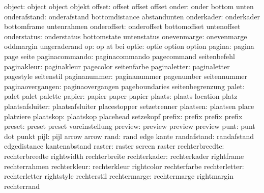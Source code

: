               object:  object               object               objekt
              offset:  offset               offset               offset
               onder:  onder                bottom               unten
        onderafstand:  onderafstand         bottomdistance       abstandunten
          onderkader:  onderkader           bottomframe          untenrahmen
         onderoffset:  onderoffset          bottomoffset         untenoffset
         onderstatus:  onderstatus          bottomstate          untenstatus
         onevenmarge:  onevenmarge          oddmargin            ungeraderand
                  op:  op                   at                   bei
               optie:  optie                option               option
              pagina:  pagina               page                 seite
      paginacommando:  paginacommando       pagecommand          seitenbefehl
         paginakleur:  paginakleur          pagecolor            seitenfarbe
        paginaletter:  paginaletter         pagestyle            seitenstil
        paginanummer:  paginanummer         pagenumber           seitennummer
    paginaovergangen:  paginaovergangen     pageboundaries       seitenbegrenzung
               palet:  palet                palet                palette
              papier:  papier               paper                papier
              plaats:  plaats               location             platz
     plaatsafsluiter:  plaatsafsluiter      placestopper         setzetrenner
            plaatsen:  plaatsen             place                platziere
           plaatskop:  plaatskop            placehead            setzekopf
              prefix:  prefix               prefix               prefix
              preset:  preset               preset               voreinstellung
             preview:  preview              preview              preview
                punt:  punt                 dot                  punkt
                pijl:  pijl                 arrow                arrow %
                rand:  rand                 edge                 kante
         randafstand:  randafstand          edgedistance         kantenabstand
              raster:  raster               screen               raster
      rechterbreedte:  rechterbreedte       rightwidth           rechterbreite
        rechterkader:  rechterkader         rightframe           rechterrahmen
        rechterkleur:  rechterkleur         rightcolor           rechterfarbe
       rechterletter:  rechterletter        rightstyle           rechterstil
        rechtermarge:  rechtermarge         rightmargin          rechterrand
